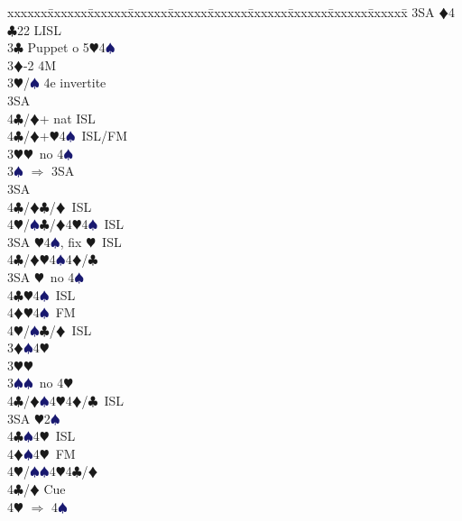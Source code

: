 \documentclass[a4paper,italian]{article}
\newcommand{\BC}{\textcolor{OliveGreen}{$\clubsuit$}}
\newcommand{\BD}{\textcolor{RedOrange}{$\vardiamondsuit$}}
\newcommand{\BH}{\textcolor{Red2}{$\varheartsuit${}}}
\newcommand{\BS}{\textcolor{MidnightBlue}{$\spadesuit${}}}
\newenvironment{bidtable}
{\begin{tabbing}

    xxxxxx\=xxxxxx\=xxxxxx\=xxxxxx\=xxxxxx\=xxxxxx\=xxxxxx\=xxxxxx\=xxxxxx\=xxxxxx\=\kill}
{\end{tabbing} }%
\begin{document}
\begin{multicols}{2}
\begin{bidtable}
                                            3SA \BD 4\BC 22 LISL\-\-\\
                                            3\BC \> Puppet o 5\BH 4\BS \+\\
                                            3\BD {}-2 4M\+\\
                                            3\BH/\BS \> 4e invertite\+\\
                                            3SA\+\\
                                            4\BC/\BD {}+ nat ISL\-\-\\
                                            4\BC/\BD {}+\BH4\BS\ ISL/FM\-\\
                                            3\BH {}\BH\ no 4\BS \+\\
                                            3\BS \> $\Rightarrow$ 3SA\+\\
                                            3SA\+\\
                                            4\BC/\BD {}\BC /\BD\ ISL\\
                                            4\BH/\BS {}\BC /\BD 4\BH 4\BS\ ISL\-\-\\
                                            3SA \BH 4\BS , fix \BH\ ISL\\
                                            4\BC/\BD {}\BH 4\BS 4\BD /\BC \-\\
                                            3SA \BH\ no 4\BS \+\\
                                            4\BC {}\BH 4\BS\ ISL\\
                                            4\BD {}\BH 4\BS\ FM\\
                                            4\BH/\BS {}\BC /\BD\ ISL\-\-\\
                                            3\BD {}\BS 4\BH \+\\
                                            3\BH {}\BH \\
                                            3\BS {}\BS\ no 4\BH \+\\
                                            4\BC/\BD {}\BS 4\BH 4\BD /\BC\ ISL\-\\
                                            3SA \BH 2\BS \+\\
                                            4\BC {}\BS 4\BH\ ISL\\
                                            4\BD {}\BS 4\BH\ FM\\
                                            4\BH/\BS {}\BS 4\BH 4\BC /\BD \-\\
                                            4\BC/\BD \> Cue\+\\
                                            4\BH \> $\Rightarrow$ 4\BS

                                        \end{bidtable}
                                    \end{multicols}
\end{document}
